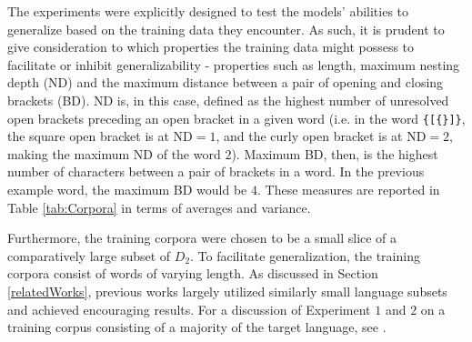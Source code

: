 The experiments were explicitly designed to test the models' abilities to generalize based on the training data they encounter. As such, it is prudent to give consideration to which properties the training data might possess to facilitate or inhibit generalizability - properties such as length, maximum nesting depth (ND) and the maximum distance between a pair of opening and closing brackets (BD). ND is, in this case, defined as the highest number of unresolved open brackets preceding an open bracket in a given word (i.e. in the word \texttt{\{[\{\}]\}}, the square open bracket is at ND$=1$, and the curly open bracket is at ND$=2$, making the maximum ND of the word $2$). Maximum BD, then, is the highest number of characters between a pair of brackets in a word. In the previous example word, the maximum BD would be $4$. These measures are reported in Table \ref{tab:Corpora} in terms of averages and variance.


Furthermore, the training corpora were chosen to be a small slice of a comparatively large subset of $D_{2}$. To facilitate generalization, the training corpora consist of words of varying length. As discussed in Section \ref{relatedWorks}, previous works largely utilized similarly small language subsets and achieved encouraging results. For a discussion of Experiment $1$ and $2$ on a training corpus consisting of a majority of the target language, see \cite{Bernardy2018}.

